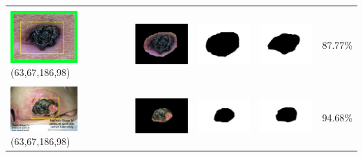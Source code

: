 \begin{table}[H]
\begin{tabular}{|m{1.0in}|m{1.0in}|m{1.0in}|m{1.0in}|m{0.6in}|}
		&  &  & \\
		\includegraphics[width=1.0in]{gambar/hasil_segmentasi/luka_hitam/image_29_rect.jpg} {\centering\fontsize{10}{10}\selectfont(63,67,186,98)}&
		\includegraphics[width=1.0in]{gambar/hasil_segmentasi/luka_hitam/result_29.jpg}&
		\includegraphics[width=1.0in]{gambar/hasil_segmentasi/luka_hitam/mask_r_29.jpg}&
		\includegraphics[width=1.0in]{gambar/hasil_segmentasi/luka_hitam/29_r.jpg}&
		87.77\% \\
		\hline 

		&  &  & \\
		\includegraphics[width=1.0in]{gambar/hasil_segmentasi/luka_hitam/image_33_rect.jpg} {\centering\fontsize{10}{10}\selectfont(63,67,186,98)}&
		\includegraphics[width=1.0in]{gambar/hasil_segmentasi/luka_hitam/result_33.jpg}&
		\includegraphics[width=1.0in]{gambar/hasil_segmentasi/luka_hitam/mask_r_33.jpg}&
		\includegraphics[width=1.0in]{gambar/hasil_segmentasi/luka_hitam/33_r.jpg}&
		94.68\% \\
		\hline 


\end{tabular}
\end{table}
